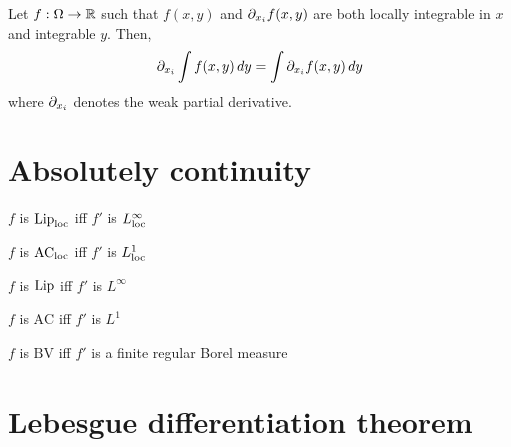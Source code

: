 \documentclass{../note}
\begin{document}
\begin{prb}
Let $f:\Omega\to\mathbb{R}$
such that $f(x,y)$ and $\pd_{x_i}f(x,y)$ are both locally integrable in $x$ and integrable $y$.
Then,
\[\pd_{x_i}\int f(x,y)\,dy=\int\pd_{x_i}f(x,y)\,dy\]
where $\pd_{x_i}$ denotes the weak partial derivative.
\end{prb}





\chapter{Absolutely continuity}

\begin{parts}
\item $f$ is $\operatorname{Lip}_{\mathrm{loc}}$ iff $f'$ is $L_{\mathrm{loc}}^\infty$
\item $f$ is $\textrm{AC}_{\mathrm{loc}}$ iff $f'$ is $L_{\mathrm{loc}}^1$
\end{parts}
\begin{parts}
\item $f$ is $\operatorname{Lip}$ iff $f'$ is $L^\infty$
\item $f$ is $\textrm{AC}$ iff $f'$ is $L^1$
\item $f$ is $\textrm{BV}$ iff $f'$ is a finite regular Borel measure
\end{parts}



\chapter{Lebesgue differentiation theorem}
\end{document}
